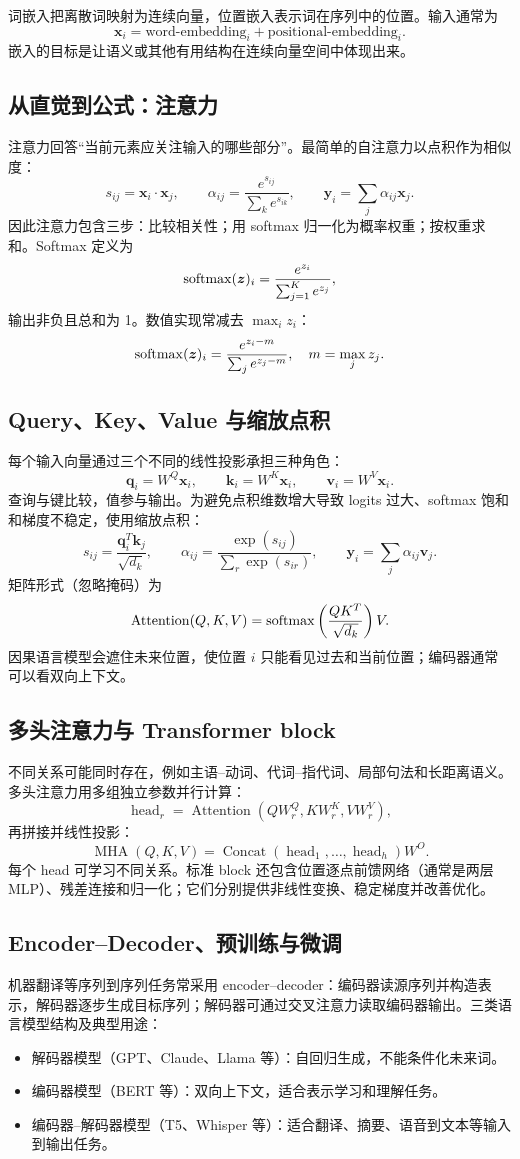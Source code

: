 \documentclass[UTF8,11pt,a4paper]{ctexart}
\begin{document}
词嵌入把离散词映射为连续向量，位置嵌入表示词在序列中的位置。输入通常为
\[
\bm x_i=\text{word-embedding}_i+\text{positional-embedding}_i.
\]
嵌入的目标是让语义或其他有用结构在连续向量空间中体现出来。

\subsection{从直觉到公式：注意力}
注意力回答“当前元素应关注输入的哪些部分”。最简单的自注意力以点积作为相似度：
\[
s_{ij}=\bm x_i\cdot\bm x_j,\qquad
\alpha_{ij}=\frac{e^{s_{ij}}}{\sum_k e^{s_{ik}}},\qquad
\bm y_i=\sum_j\alpha_{ij}\bm x_j.
\]
因此注意力包含三步：比较相关性；用 softmax 归一化为概率权重；按权重求和。Softmax 定义为
\[
\operatorname{softmax}(\bm z)_i=\frac{e^{z_i}}{\sum_{j=1}^{K}e^{z_j}},
\]
输出非负且总和为 1。数值实现常减去 $\max_i z_i$：\[
\operatorname{softmax}(\bm z)_i=\frac{e^{z_i-m}}{\sum_j e^{z_j-m}},\quad m=\max_jz_j.
\]

\subsection{Query、Key、Value 与缩放点积}
每个输入向量通过三个不同的线性投影承担三种角色：
\[
\bm q_i=W^Q\bm x_i,\qquad \bm k_i=W^K\bm x_i,\qquad \bm v_i=W^V\bm x_i.
\]
查询与键比较，值参与输出。为避免点积维数增大导致 logits 过大、softmax 饱和和梯度不稳定，使用缩放点积：
\[
s_{ij}=\frac{\bm q_i^T\bm k_j}{\sqrt{d_k}},\qquad
\alpha_{ij}=\frac{\exp(s_{ij})}{\sum_{r}\exp(s_{ir})},\qquad
\bm y_i=\sum_j\alpha_{ij}\bm v_j.
\]
矩阵形式（忽略掩码）为
\[
\operatorname{Attention}(Q,K,V)=\operatorname{softmax}\left(\frac{QK^T}{\sqrt{d_k}}\right)V.
\]
因果语言模型会遮住未来位置，使位置 $i$ 只能看见过去和当前位置；编码器通常可以看双向上下文。

\subsection{多头注意力与 Transformer block}
不同关系可能同时存在，例如主语--动词、代词--指代词、局部句法和长距离语义。多头注意力用多组独立参数并行计算：
\[
\operatorname{head}_r=\operatorname{Attention}(QW_r^Q,KW_r^K,VW_r^V),
\]
再拼接并线性投影：
\[
\operatorname{MHA}(Q,K,V)=\operatorname{Concat}(\operatorname{head}_1,\ldots,\operatorname{head}_h)W^O.
\]
每个 head 可学习不同关系。标准 block 还包含位置逐点前馈网络（通常是两层 MLP）、残差连接和归一化；它们分别提供非线性变换、稳定梯度并改善优化。

\subsection{Encoder--Decoder、预训练与微调}
机器翻译等序列到序列任务常采用 encoder--decoder：编码器读源序列并构造表示，解码器逐步生成目标序列；解码器可通过交叉注意力读取编码器输出。三类语言模型结构及典型用途：\begin{itemize}
\item 解码器模型（GPT、Claude、Llama 等）：自回归生成，不能条件化未来词。
\item 编码器模型（BERT 等）：双向上下文，适合表示学习和理解任务。
\item 编码器--解码器模型（T5、Whisper 等）：适合翻译、摘要、语音到文本等输入到输出任务。
\end{itemize}
\end{document}
